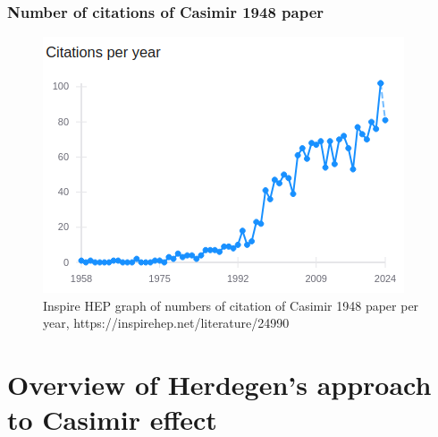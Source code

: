 \documentclass[10pt,t]{beamer}
\begin{document}
\begin{frame}
  \frametitle{Number of citations of Casimir 1948 paper}


  \begin{figure}

    \label{fig:aaa}

    \centering


    \includegraphics[scale=0.6]
    {./Presentation-pictures/Casimir-paper-citations.png}

    \caption{Inspire HEP graph of numbers of citation of Casimir 1948 paper
      per year, 
      {https://inspirehep.net/literature/24990}}


  \end{figure}

\end{frame}










\section{Overview of Herdegen's approach to Casimir effect}
\end{document}
